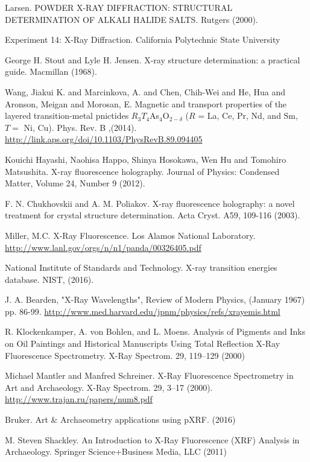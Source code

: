 \documentclass[%
 reprint,
 amsmath,amssymb,
 aps,
 pra,
]{revtex4-1}
\begin{document}
\begin{thebibliography}{6}
	 Larsen. POWDER X-RAY DIFFRACTION: STRUCTURAL DETERMINATION OF ALKALI HALIDE SALTS. Rutgers (2000).
	 
	 Experiment 14: X-Ray Diffraction. California Polytechnic State University 
	 
	 George H. Stout and Lyle H. Jensen. X-ray structure determination: a practical guide. Macmillan (1968).
	 
	 Wang, Jiakui K. and Marcinkova, A. and Chen, Chih-Wei and He, Hua and Aronson, Meigan and Morosan, E. Magnetic and transport properties of the layered transition-metal pnictides ${R}_{3}{T}_{4}$As${}_{4}$O${}_{2\ensuremath{-}\ensuremath{\delta}}$ ($R$ = La, Ce, Pr, Nd, and Sm, $T=$ Ni, Cu). Phys. Rev. B ,(2014). \url{http://link.aps.org/doi/10.1103/PhysRevB.89.094405}
	 
	 Kouichi Hayashi, Naohisa Happo, Shinya Hosokawa, Wen Hu and Tomohiro Matsushita. X-ray fluorescence holography. Journal of Physics: Condensed Matter, Volume 24, Number 9 (2012).
	 
	 F. N. Chukhovskii and A. M. Poliakov. X-ray fluorescence holography: a novel treatment for crystal structure determination. Acta Cryst. A59, 109-116 (2003).
	 
	 Miller, M.C. X-Ray Fluorescence. Los Alamos National Laboratory. \url{http://www.lanl.gov/orgs/n/n1/panda/00326405.pdf}
	 
	 National Institute of Standards and Technology. X-ray transition energies database. NIST, (2016).
	 
	 J. A. Bearden, "X-Ray Wavelengths", Review of Modern Physics, (January 1967) pp. 86-99. \url{http://www.med.harvard.edu/jpnm/physics/refs/xrayemis.html}

	R. Klockenkamper, A. von Bohlen, and L. Moens. Analysis of Pigments and Inks on Oil Paintings and Historical Manuscripts Using Total Reflection X-Ray Fluorescence Spectrometry. X-Ray Spectrom. 29, 119–129 (2000)
	
	Michael Mantler and Manfred Schreiner. X-Ray Fluorescence Spectrometry in Art and Archaeology. X-Ray Spectrom. 29, 3–17 (2000). \url{http://www.trajan.ru/papers/num8.pdf}
	
	Bruker. Art \& Archaeometry applications using pXRF. (2016)
	
	M. Steven Shackley. An Introduction to X-Ray Fluorescence (XRF) Analysis in Archaeology. Springer Science+Business Media, LLC (2011)
	

\end{thebibliography}
\end{document}
